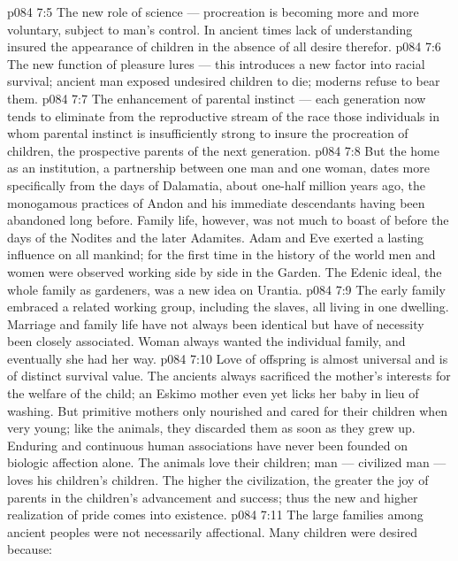 \vs p084 7:5 \pc {}\bibnobreakspace The new role of science --- procreation is becoming more and more voluntary, subject to man’s control. In ancient times lack of understanding insured the appearance of children in the absence of all desire therefor.
\vs p084 7:6 \pc {}\bibnobreakspace The new function of pleasure lures --- this introduces a new factor into racial survival; ancient man exposed undesired children to die; moderns refuse to bear them.
\vs p084 7:7 \pc {}\bibnobreakspace The enhancement of parental instinct --- each generation now tends to eliminate from the reproductive stream of the race those individuals in whom parental instinct is insufficiently strong to insure the procreation of children, the prospective parents of the next generation.
\vs p084 7:8 \pc But the home as an institution, a partnership between one man and one woman, dates more specifically from the days of Dalamatia, about one\hyp{}half million years ago, the monogamous practices of Andon and his immediate descendants having been abandoned long before. Family life, however, was not much to boast of before the days of the Nodites and the later Adamites. Adam and Eve exerted a lasting influence on all mankind; for the first time in the history of the world men and women were observed working side by side in the Garden. The Edenic ideal, the whole family as gardeners, was a new idea on Urantia.
\vs p084 7:9 The early family embraced a related working group, including the slaves, all living in one dwelling. Marriage and family life have not always been identical but have of necessity been closely associated. Woman always wanted the individual family, and eventually she had her way.
\vs p084 7:10 \pc Love of offspring is almost universal and is of distinct survival value. The ancients always sacrificed the mother’s interests for the welfare of the child; an Eskimo mother even yet licks her baby in lieu of washing. But primitive mothers only nourished and cared for their children when very young; like the animals, they discarded them as soon as they grew up. Enduring and continuous human associations have never been founded on biologic affection alone. The animals love their children; man --- civilized man --- loves his children’s children. The higher the civilization, the greater the joy of parents in the children’s advancement and success; thus the new and higher realization of  pride comes into existence.
\vs p084 7:11 The large families among ancient peoples were not necessarily affectional. Many children were desired because:
